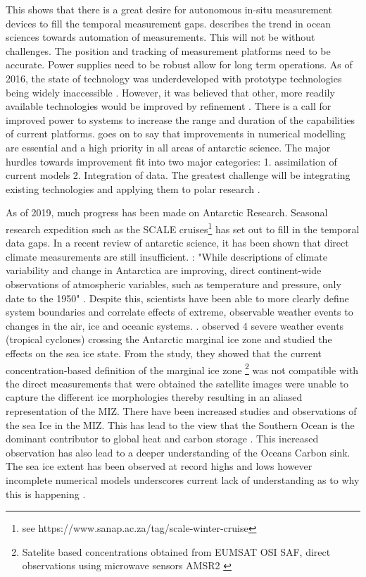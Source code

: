 This shows that there is a great desire for autonomous in-situ measurement devices to fill the temporal measurement gaps. \textcite{kennicutt2016delivering} describes the trend in ocean sciences towards automation of measurements. This will not be without challenges. The position and tracking of measurement platforms need to be accurate. Power supplies need to be robust allow for long term operations. As of 2016, the state of technology was underdeveloped with prototype technologies being widely inaccessible \cite{kennicutt2016delivering}. However, it was believed that other, more readily available technologies would be improved by refinement \cite{kennicutt2016delivering}. There is a call for improved power to systems to increase the range and duration of the capabilities of current platforms. \textcite{kennicutt2016delivering} goes on to say that improvements in numerical modelling are essential and a high priority in all areas of antarctic science. The major hurdles towards improvement fit into two major categories: 1. assimilation of current models 2. Integration of data. The greatest challenge will be integrating existing technologies and applying them to polar research \cite{kennicutt2016delivering}.\par 

As of 2019, much progress has been made on Antarctic Research. Seasonal research expedition such as the SCALE cruises\footnote{see https://www.sanap.ac.za/tag/scale-winter-cruise} has set out to fill in the temporal data gaps. In a recent review of antarctic science, it has been shown that direct climate measurements are still insufficient. \textcite{kennicutt2019sustained}: "While descriptions of climate variability and change in
Antarctica are improving, direct continent-wide observations of
atmospheric variables, such as temperature and pressure, only
date to the 1950" \cite{kennicutt2019sustained}. Despite this, scientists have been able to more clearly define system boundaries and correlate effects of extreme, observable weather events to changes in the air, ice and oceanic systems. \textcite{vichi2019effects}. observed 4 severe weather events (tropical cyclones) crossing the Antarctic marginal ice zone and studied the effects on the sea ice state. From the study, they showed that the current concentration-based definition of the marginal ice zone \footnote{Satelite based concentrations obtained from EUMSAT OSI SAF, direct observations using microwave sensors AMSR2 \cite{vichi2019effects}} was not compatible with the direct measurements that were obtained \cite{vichi2019effects} the satellite images were unable to capture the different ice morphologies thereby resulting in an aliased representation of the MIZ. There have been increased studies and observations of the sea Ice in the MIZ. This has lead to the view that the Southern Ocean is the dominant contributor to global heat and carbon storage \cite{kennicutt2019sustained}. This increased observation has also lead to a deeper understanding of the Oceans Carbon sink. The sea ice extent has been observed at record highs and lows however incomplete numerical models underscores current lack of understanding as to why this is happening \cite{kennicutt2019sustained}. \par 

